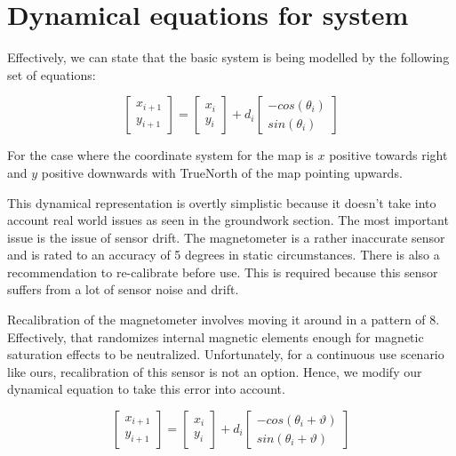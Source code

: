 \section{Dynamical equations for system}

Effectively, we can state that the basic system is being modelled by the
following set of equations:

\begin{equation}\label{eq:dr_eq}
\begin{bmatrix}x_{i+1}\\
y_{i+1}
\end{bmatrix} = \begin{bmatrix}x_{i}\\
y_{i}
\end{bmatrix}  + d{}_{i} \begin{bmatrix}-cos(\theta_{i})\\
sin(\theta_{i})
\end{bmatrix} 
\end{equation}

For the case where the coordinate system for the map is $x$ positive towards right and $y$  positive downwards with TrueNorth  of the map pointing upwards.

This dynamical representation is overtly simplistic because it doesn't take into account real world issues as seen in the groundwork section. The most important issue is the issue of sensor drift. The magnetometer is a rather inaccurate sensor and is rated to an accuracy of 5 degrees in static circumstances. There is also a recommendation to re-calibrate before use. This is required because this sensor suffers from a lot of sensor noise and drift. 

Recalibration of the magnetometer involves moving it around in a pattern of 8. Effectively, that randomizes internal magnetic elements enough for magnetic saturation effects to be neutralized. Unfortunately, for a continuous use scenario like ours, recalibration of this sensor is not an option. Hence, we modify our dynamical equation to take this error into account.

\begin{equation}
\begin{bmatrix}x_{i+1}\\
y_{i+1}
\end{bmatrix} = \begin{bmatrix}x_{i}\\
y_{i}
\end{bmatrix}  + d{}_{i} \begin{bmatrix}-cos(\theta_{i}+\vartheta)\\
sin(\theta_{i}+\vartheta)
\end{bmatrix} 
\end{equation}


